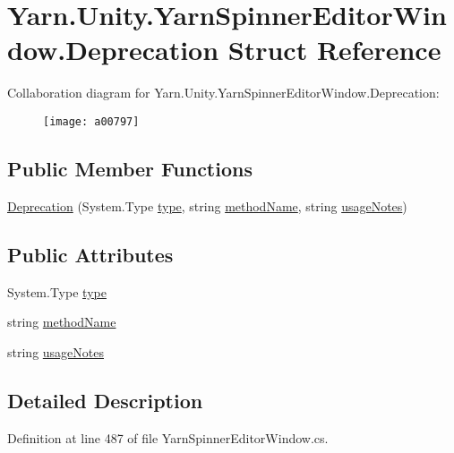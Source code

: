 \hypertarget{a00090}{\section{Yarn.\-Unity.\-Yarn\-Spinner\-Editor\-Window.\-Deprecation Struct Reference}
\label{a00090}
}


Collaboration diagram for Yarn.\-Unity.\-Yarn\-Spinner\-Editor\-Window.\-Deprecation\-:
\nopagebreak
\begin{figure}[H]
\begin{center}
\leavevmode
\texttt{[image: a00797]}
\end{center}
\end{figure}
\subsection*{Public Member Functions}
\begin{DoxyCompactItemize}
\item 
\hyperlink{a00090_ae80171841e97a48611c51a9a574a2fc0}{Deprecation} (System.\-Type \hyperlink{a00090_a750904df254223bf3131c39017f90a0b}{type}, string \hyperlink{a00090_a61605b2d0a17dfdf9c62952270d44fbd}{method\-Name}, string \hyperlink{a00090_ac23509be7ae6b43a3e2154dd430954a7}{usage\-Notes})
\end{DoxyCompactItemize}
\subsection*{Public Attributes}
\begin{DoxyCompactItemize}
\item 
System.\-Type \hyperlink{a00090_a750904df254223bf3131c39017f90a0b}{type}
\item 
string \hyperlink{a00090_a61605b2d0a17dfdf9c62952270d44fbd}{method\-Name}
\item 
string \hyperlink{a00090_ac23509be7ae6b43a3e2154dd430954a7}{usage\-Notes}
\end{DoxyCompactItemize}


\subsection{Detailed Description}


Definition at line 487 of file Yarn\-Spinner\-Editor\-Window.\-cs.



